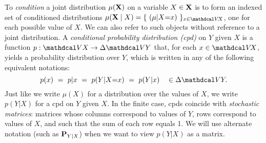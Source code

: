To \emph{condition} a joint distribution $\mu(\mathbf X)$ on a variable $X \in \mathbf X$ is to form an indexed set of conditioned distributions $\mu(\mat X \mid X) = \{ ~(\mu|X{=}x) ~\}_{x \in \V\!X}$, one for each possible value of $X$. 
We can also refer to such objects without reference to a joint distribution.
%
%
A \emph{conditional probability distribution (cpd)} on $Y$ given $X$ is a function $p : \V X \to \Delta \V Y$ that, for each $x \in \V\!X$, yields a probability distribution over $Y$,
which is written in any of the following equivalent notations:
\[ 
p(x) ~=~ p|x ~=~ p(Y | X{=}x) ~=~ p(Y | x) \quad \in \Delta \V Y.
\]
Just like we write $\mu(X)$ for a distribution over the values of $X$, we
write $p(Y|X)$ for a cpd on $Y$ given $X$. 
In the finite case, cpds coincide with \emph{stochastic matrices}: matrices whose columns correspond to values of $Y$, rows correspond to values of $X$, and such that the sum of each row equals 1. 
We will use alternate notation (such as $\mathbf P_{Y|X}$) when we want to view $p(Y|X)$ as a matrix.

